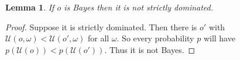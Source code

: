 \documentclass[a4paper]{article}
\newtheorem{theorem}{Theorem}
\newtheorem{lemma}[theorem]{Lemma}
\renewcommand\O{\mathcal{O}}
\newcommand\Uwald{\mathcal{U}} %
\newcommand{\todoold}[2][]{\todo[backgroundcolor=white,bordercolor=orange!10,linecolor=gray!10, #1,caption={},textcolor=gray]{Pre-rev: #2}}
\newenvironment{CCM rewritten}
{\begingroup\color{blue}} %
{\endgroup}              %
\begin{document}
	
	
	
	
	
	\begin{lemma}\label{thm:cct:Bayes implies admiss}
		If $o$ is Bayes then it is not strictly dominated.
	\end{lemma}
	\begin{proof}
		Suppose it is strictly dominated. Then there is $o'$ with $\Uwald(o,\omega)<\Uwald(o',\omega)$ for all $\omega$. So every probability $p$ will have $p( \Uwald(o))<p(\Uwald(o'))$. Thus it is not Bayes.
	\end{proof}
	
\end{document}
